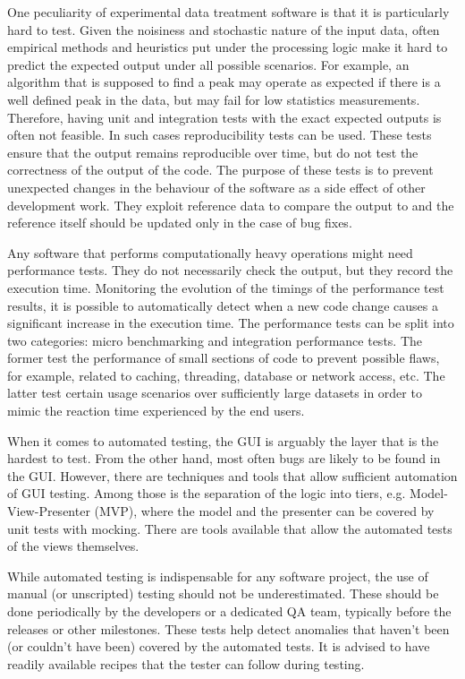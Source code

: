 \documentclass[jnr]{iosart2x}
\begin{document}
One peculiarity of experimental data treatment software is that it is particularly hard to test.
Given the noisiness and stochastic nature of the input data, often empirical methods and heuristics put under the processing logic make it hard to predict the expected output under all possible scenarios.
For example, an algorithm that is supposed to find a peak may operate as expected if there is a well defined peak in the data, but may fail for low statistics measurements.
Therefore, having unit and integration tests with the exact expected outputs is often not feasible.
In such cases reproducibility tests can be used.
These tests ensure that the output remains reproducible over time, but do not test the correctness of the output of the code.
The purpose of these tests is to prevent unexpected changes in the behaviour of the software as a side effect of other development work.
They exploit reference data to compare the output to and the reference itself should be updated only in the case of bug fixes.

Any software that performs computationally heavy operations might need performance tests.
They do not necessarily check the output, but they record the execution time.
Monitoring the evolution of the timings of the performance test results, it is possible to automatically detect when a new code change causes a significant increase in the execution time.
The performance tests can be split into two categories: micro benchmarking and integration performance tests.
The former test the performance of small sections of code to prevent possible flaws, for example, related to caching, threading, database or network access, etc.
The latter test certain usage scenarios over sufficiently large datasets in order to mimic the reaction time  experienced by the end users.

When it comes to automated testing, the GUI is arguably the layer that is the hardest to test.
From the other hand, most often bugs are likely to be found in the GUI.
However, there are techniques and tools that allow sufficient automation of GUI testing.
Among those is the separation of the logic into tiers, e.g. Model-View-Presenter (MVP), where the model and the presenter can be covered by unit tests with mocking.
There are tools available that allow the automated tests of the views themselves.

While automated testing is indispensable for any software project, the use of manual (or unscripted) testing should not be underestimated.
These should be done periodically by the developers or a dedicated QA team, typically before the releases or other milestones.
These tests help detect anomalies that haven't been (or couldn't have been) covered by the automated tests.
It is advised to have readily available recipes that the tester can follow during testing.
\end{document}

